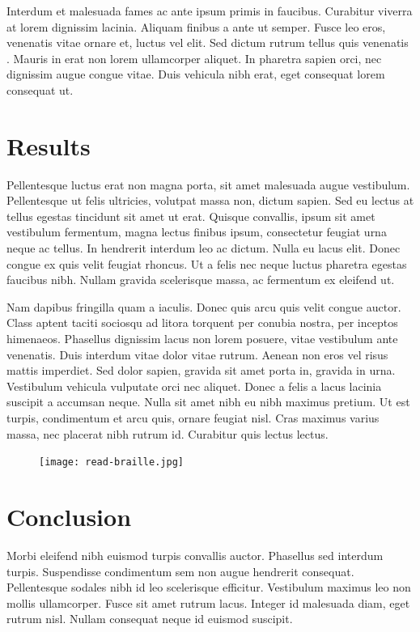 \documentclass[onecolumn]{article}
\begin{document}
Interdum et malesuada fames ac ante ipsum primis in faucibus. Curabitur
viverra at lorem dignissim lacinia. Aliquam finibus a ante ut semper. Fusce
leo eros, venenatis vitae ornare et, luctus vel elit. Sed dictum rutrum
tellus quis venenatis\unskip~\cite{572698:13280063} . Mauris in erat non
lorem ullamcorper aliquet. In pharetra sapien orci, nec dignissim augue
congue vitae. Duis vehicula nibh erat, eget consequat lorem consequat ut.


    
\section*{Results}
Pellentesque luctus erat non magna porta, sit amet malesuada augue
vestibulum. Pellentesque ut felis ultricies, volutpat massa non, dictum
sapien. Sed eu lectus at tellus egestas tincidunt sit amet ut erat. Quisque
convallis, ipsum sit amet vestibulum fermentum, magna lectus finibus ipsum,
consectetur feugiat urna neque ac tellus. In hendrerit interdum leo ac
dictum. Nulla eu lacus elit. Donec congue ex quis velit feugiat rhoncus. Ut
a felis nec neque luctus pharetra egestas faucibus nibh. Nullam gravida
scelerisque massa, ac fermentum ex eleifend ut.

Nam dapibus fringilla quam a iaculis. Donec quis arcu quis velit congue
auctor. Class aptent taciti sociosqu ad litora torquent per conubia nostra,
per inceptos himenaeos. Phasellus dignissim lacus non lorem posuere, vitae
vestibulum ante venenatis. Duis interdum vitae dolor vitae rutrum. Aenean
non eros vel risus mattis imperdiet. Sed dolor sapien, gravida sit amet
porta in, gravida in urna. Vestibulum vehicula vulputate orci nec aliquet.
Donec a felis a lacus lacinia suscipit a accumsan neque. Nulla sit amet
nibh eu nibh maximus pretium. Ut est turpis, condimentum et arcu quis,
ornare feugiat nisl. Cras maximus varius massa, nec placerat nibh rutrum
id. Curabitur quis lectus lectus.

\begin{figure}
\texttt{[image: read-braille.jpg]}
\end{figure}

    
\section*{Conclusion}
Morbi eleifend nibh euismod turpis convallis auctor. Phasellus sed interdum
turpis. Suspendisse condimentum sem non augue hendrerit consequat.
Pellentesque sodales nibh id leo scelerisque efficitur. Vestibulum maximus
leo non mollis ullamcorper\cite{Vogel:1979}. Fusce sit amet rutrum lacus. Integer id
malesuada diam, eget rutrum nisl. Nullam consequat neque id euismod
suscipit.
\end{document}
